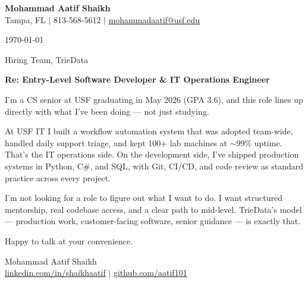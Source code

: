 \documentclass[letterpaper,11pt]{article}
\begin{document}
\textbf{Mohammad Aatif Shaikh}\\
Tampa, FL $|$ 813-568-5612 $|$
\href{mailto:mohammadaatif@usf.edu}{mohammadaatif@usf.edu}

\today

Hiring Team, TrieData

\textbf{Re: Entry-Level Software Developer \& IT Operations Engineer}

I'm a CS senior at USF graduating in May 2026 (GPA 3.6), and this role lines up directly with what I've been doing — not just studying.

At USF IT I built a workflow automation system that was adopted team-wide, handled daily support triage, and kept 100+ lab machines at $\sim$99\% uptime. That's the IT operations side. On the development side, I've shipped production systems in Python, C\#, and SQL, with Git, CI/CD, and code review as standard practice across every project.

I'm not looking for a role to figure out what I want to do. I want structured mentorship, real codebase access, and a clear path to mid-level. TrieData's model — production work, customer-facing software, senior guidance — is exactly that.

Happy to talk at your convenience.

\vspace{8pt}
Mohammad Aatif Shaikh\\
\href{https://linkedin.com/in/shaikhaatif}{linkedin.com/in/shaikhaatif} $|$
\href{https://github.com/aatif101}{github.com/aatif101}
\end{document}
